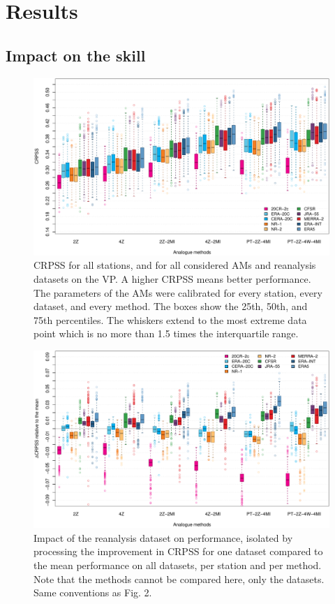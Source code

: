 \documentclass[alpha-refs]{wiley-article}
\begin{document}
\section{Results}
\subsection{Impact on the skill}

\begin{figure}[bt]
    \centering
    \includegraphics[width=\textwidth]{figures/boxplot-per-method.pdf}
    \caption{CRPSS for all stations, and for all considered AMs and reanalysis datasets on the VP. A higher CRPSS means better performance. The parameters of the AMs were calibrated for every station, every dataset, and every method. The boxes show the 25th, 50th, and 75th percentiles. The whiskers extend to the most extreme data point which is no more than 1.5 times the interquartile range.}
    \label{fig:comparison_values}
\end{figure}

\begin{figure}[bt]
    \centering
    \includegraphics[width=\textwidth]{figures/boxplot-per-method-diff.pdf}
    \caption{Impact of the reanalysis dataset on performance, isolated by processing the improvement in CRPSS for one dataset compared to the mean performance on all datasets, per station and per method. Note that the methods cannot be compared here, only the datasets. Same conventions as Fig. 2.}
    \label{fig:comparison_relative}
\end{figure}
\end{document}
